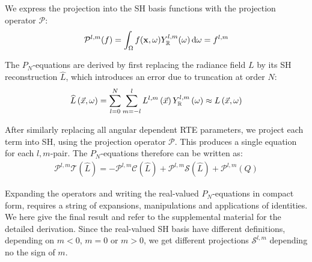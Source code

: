 We express the projection into the SH basis functions with the projection operator $\mathcal{P}$:
\begin{align}
\mathcal{P}^{l, m}(f) = \int_{\Omega}f(\mathbf{x}, \omega) Y_{\mathbb{R}}^{l,m}(\omega)\,\mathrm{d}\omega = f^{l,m}
\nonumber
\end{align}

The $P_N$-equations are derived by first replacing the radiance field $L$ by its SH reconstruction $\widehat{L}$, which introduces an error due to truncation at order $N$:
\begin{align*}
\widehat{L}\left(\vec{x}, \omega\right) =
\sum_{l=0}^{N}
{
\sum_{m=-l}^{l}
{
L^{l,m}\left(\vec{x}\right)Y_{\mathbb{R}}^{l,m}\left(\omega\right)
}
}
\approx
L\left(\vec{x}, \omega\right)
\end{align*}

After similarly replacing all angular dependent RTE parameters, we project each term into SH, using the projection operator $\mathcal{P}$. This produces a single equation for each $l,m$-pair. The $P_N$-equations therefore can be written as:
\begin{align}
\mathcal{P}^{l,m}\mathcal{T}\left(\widehat{L}\right)
=
-\mathcal{P}^{l,m}\mathcal{C}\left(\widehat{L}\right) 
+\mathcal{P}^{l,m}\mathcal{S}\left(\widehat{L}\right)
+\mathcal{P}^{l,m}\left(Q\right)
\nonumber
\end{align}

Expanding the operators and writing the real-valued $P_N$-equations in compact form, requires a string of expansions, manipulations and applications of identities. We here give the final result and refer to the supplemental material for the detailed derivation. Since the real-valued SH basis have different definitions, depending on $m<0$, $m=0$ or $m>0$, we get different projections $\mathcal{S}^{l,m}$ depending no the sign of $m$.

